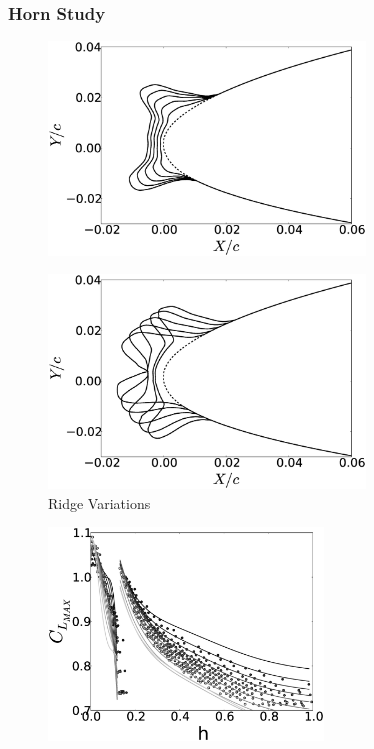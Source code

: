 \documentclass[9pt]{beamer}
\begin{document}
\begin{frame}
\frametitle{Horn Study}
\label{sec-2-8}

\centering
\vspace{-0.5cm}
\begin{minipage}[t]{0.45\linewidth}
\begin{figure}[t]
\includegraphics[width=0.75\textwidth]{HornHVariation}
\end{figure}
\vspace{-0.5cm}
\begin{figure}[t]
\includegraphics[width=0.75\textwidth]{HornSVariation}
\caption{Ridge Variations}
\end{figure}
\vspace{-0.5cm}
\end{minipage}
\begin{minipage}[t]{0.45\linewidth}
\begin{figure}[t]
\includegraphics[width=0.65\textwidth]{CLMAX_MEGPCHORN}

\end{figure}
\end{minipage}
\end{frame}
\end{document}
